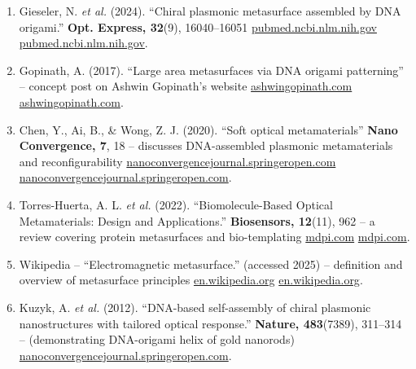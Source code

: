 \documentclass[11pt,a4paper]{article}
\begin{document}
\begin{enumerate}
  \item Gieseler, N. \emph{et al.} (2024). ``Chiral plasmonic metasurface assembled by DNA origami.'' \textbf{Opt. Express, 32}(9), 16040--16051 \href{https://pubmed.ncbi.nlm.nih.gov/38859241/#:~:text=response in a much more,simulate the optical properties but}{pubmed.ncbi.nlm.nih.gov} \href{https://pubmed.ncbi.nlm.nih.gov/38859241/#:~:text=fabricated with top,of the suggested approach critically}{pubmed.ncbi.nlm.nih.gov}.
  \item Gopinath, A. (2017). ``Large area metasurfaces via DNA origami patterning'' -- concept post on Ashwin Gopinath's website \href{https://ashwingopinath.com/large-area-nanopatterning#:~:text=A unique class of second,of metal nanoparticles that passively}{ashwingopinath.com} \href{https://ashwingopinath.com/large-area-nanopatterning#:~:text=while there are niche applications,be ideal for this purpose}{ashwingopinath.com}.
  \item Chen, Y., Ai, B., \& Wong, Z. J. (2020). ``Soft optical metamaterials'' \textbf{Nano Convergence, 7}, 18 -- discusses DNA-assembled plasmonic metamaterials and reconfigurability \href{https://nanoconvergencejournal.springeropen.com/articles/10.1186/s40580-020-00226-7#:~:text=metamaterials. A DNA,in handedness%2C color and intensity}{nanoconvergencejournal.springeropen.com} \href{https://nanoconvergencejournal.springeropen.com/articles/10.1186/s40580-020-00226-7#:~:text=DNA,143]. Here%2C DNA is}{nanoconvergencejournal.springeropen.com}.
  \item Torres-Huerta, A. L. \emph{et al.} (2022). ``Biomolecule-Based Optical Metamaterials: Design and Applications.'' \textbf{Biosensors, 12}(11), 962 -- a review covering protein metasurfaces and bio-templating \href{https://www.mdpi.com/2079-6374/12/11/962#:~:text=diversify their optical properties%2C dielectric,a number of fascinating smart}{mdpi.com} \href{https://www.mdpi.com/2079-6374/12/11/962#:~:text=In 2009%2C Amsden et al,illumination and angle of collection}{mdpi.com}.
  \item Wikipedia -- ``Electromagnetic metasurface.'' (accessed 2025) -- definition and overview of metasurface principles \href{https://en.wikipedia.org/wiki/Electromagnetic_metasurface#:~:text=A metasurface is generally defined,2}{en.wikipedia.org} \href{https://en.wikipedia.org/wiki/Electromagnetic_metasurface#:~:text=unusual properties through three,2}{en.wikipedia.org}.
  \item Kuzyk, A. \emph{et al.} (2012). ``DNA-based self-assembly of chiral plasmonic nanostructures with tailored optical response.'' \textbf{Nature, 483}(7389), 311--314 -- (demonstrating DNA-origami helix of gold nanorods) \href{https://nanoconvergencejournal.springeropen.com/articles/10.1186/s40580-020-00226-7#:~:text=metamaterials. A DNA,in handedness%2C color and intensity}{nanoconvergencejournal.springeropen.com}.

\end{enumerate}
\end{document}
